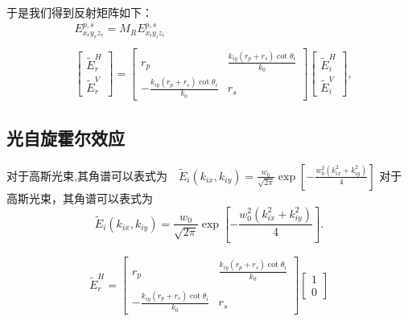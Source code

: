 \documentclass[12pt]{ctexart}
\numberwithin{equation}{section} %
\begin{document}
于是我们得到反射矩阵如下：
\begin{align*}
        &E_{x_r y_r z_r}^{p,s} = M_R E_{x_i y_i z_i}^{p,s} \\\\
        & \begin{bmatrix} \tilde{E}_r^H \\ \tilde{E}_r^V \end{bmatrix} = 
        \begin{bmatrix} 
            r_p & \frac{k_{iy} (r_p + r_s) \cot \theta_i}{k_0} \\ 
            -\frac{k_{iy} (r_p + r_s) \cot \theta_i}{k_0} & r_s 
        \end{bmatrix} 
        \begin{bmatrix} \tilde{E}_i^H \\ \tilde{E}_i^V \end{bmatrix},
        \end{align*}

\subsection{光自旋霍尔效应}
$\text{对于高斯光束,其角谱可以表式为}\quad\tilde{E}_i(k_{ix},k_{iy})=\frac{w_0}{\sqrt{2\pi}}\exp\left[-\frac{w_0^2(k_{ix}^2+k_{iy}^2)}4\right]$
对于高斯光束，其角谱可以表式为
\[
\tilde{E}_i(k_{ix},k_{iy})=\frac{w_0}{\sqrt{2\pi}}\exp\left[-\frac{w_0^2(k_{ix}^2+k_{iy}^2)}{4}\right].
\]

\begin{align*}
    \tilde{E}_r^H = 
    \begin{bmatrix} 
        r_p & \frac{k_{iy} (r_p + r_s) \cot \theta_i}{k_0} \\\\
        -\frac{k_{iy} (r_p + r_s) \cot \theta_i}{k_0} & r_s 
    \end{bmatrix} 
    \begin{bmatrix} 1 \\ 0 \end{bmatrix} \\[1em]
\end{align*}
\end{document}
